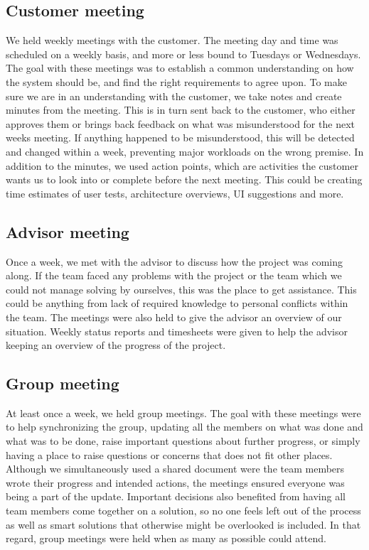 \documentclass[11pt]{book}
\begin{document}
\subsection{Customer meeting}
We held weekly meetings with the customer. The meeting day and time was scheduled on a weekly basis, and more or less bound to Tuesdays or Wednesdays. The goal with these meetings was to establish a common understanding on how the system should be, and find the right requirements to agree upon. To make sure we are in an understanding with the customer, we take notes and create minutes from the meeting. This is in turn sent back to the customer, who either approves them or brings back feedback on what was misunderstood for the next weeks meeting. If anything happened to be misunderstood, this will be detected and changed within a week, preventing major workloads on the wrong premise. In addition to the minutes, we used action points, which are activities the customer wants us to look into or complete before the next meeting. This could be creating time estimates of user tests, architecture overviews, UI suggestions and more.

\subsection{Advisor meeting}
Once a week, we met with the advisor to discuss how the project was coming along. If the team faced any problems with the project or the team which we could not manage solving by ourselves, this was the place to get assistance. This could be anything from lack of required knowledge to personal conflicts within the team. The meetings were also held to give the advisor an overview of our situation. Weekly status reports and timesheets were given to help the advisor keeping an overview of the progress of the project.

\subsection{Group meeting}
At least once a week, we held group meetings. The goal with these meetings were to help synchronizing the group, updating all the members on what was done and what was to be done, raise important questions about further progress, or simply having a place to raise questions or concerns that does not fit other places. Although we simultaneously used a shared document were the team members wrote their progress and intended actions, the meetings ensured everyone was being a part of the update. Important decisions also benefited from having all team members come together on a solution, so no one feels left out of the process as well as smart solutions that otherwise might be overlooked is included.  In that regard, group meetings were held when as many as possible could attend.
\end{document}
